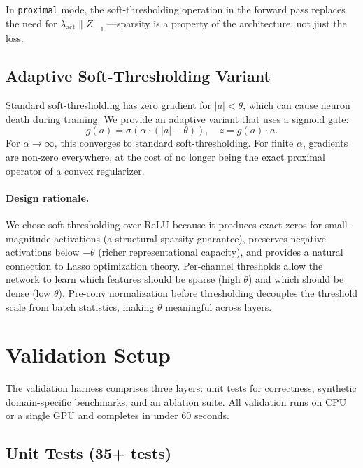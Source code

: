 \documentclass{article}
\begin{document}
In \texttt{proximal} mode, the soft-thresholding operation in the forward pass
replaces the need for $\lambda_{\text{act}} \|Z\|_1$---sparsity is a property
of the architecture, not just the loss.

\subsection{Adaptive Soft-Thresholding Variant}

Standard soft-thresholding has zero gradient for $|a| < \theta$, which can
cause neuron death during training. We provide an adaptive variant that uses
a sigmoid gate:
\begin{equation}
    g(a) = \sigma(\alpha \cdot (|a| - \theta)), \quad
    z = g(a) \cdot a.
\end{equation}
For $\alpha \to \infty$, this converges to standard soft-thresholding. For
finite $\alpha$, gradients are non-zero everywhere, at the cost of no longer
being the exact proximal operator of a convex regularizer.

\paragraph{Design rationale.}
We chose soft-thresholding over ReLU because it produces exact zeros for
small-magnitude activations (a structural sparsity guarantee), preserves
negative activations below $-\theta$ (richer representational capacity), and
provides a natural connection to Lasso optimization theory. Per-channel
thresholds allow the network to learn which features should be sparse (high
$\theta$) and which should be dense (low $\theta$). Pre-conv normalization
before thresholding decouples the threshold scale from batch statistics,
making $\theta$ meaningful across layers.

\section{Validation Setup}
\label{sec:validation}

The validation harness comprises three layers: unit tests for correctness,
synthetic domain-specific benchmarks, and an ablation suite. All validation
runs on CPU or a single GPU and completes in under 60 seconds.

\subsection{Unit Tests (35+ tests)}
\end{document}

